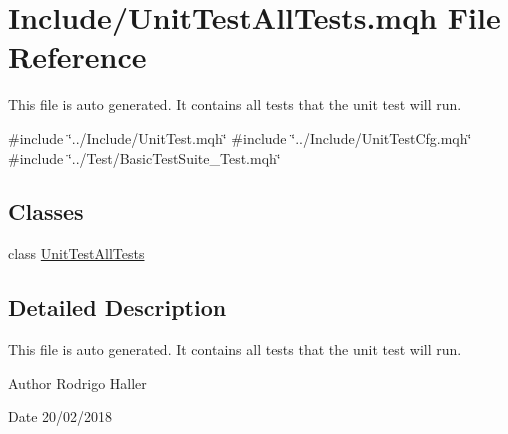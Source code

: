 \hypertarget{_unit_test_all_tests_8mqh}{}\section{Include/\+Unit\+Test\+All\+Tests.mqh File Reference}
\label{_unit_test_all_tests_8mqh}


This file is auto generated. It contains all tests that the unit test will run.  


{\ttfamily \#include \char`\"{}../\+Include/\+Unit\+Test.\+mqh\char`\"{}}\newline
{\ttfamily \#include \char`\"{}../\+Include/\+Unit\+Test\+Cfg.\+mqh\char`\"{}}\newline
{\ttfamily \#include \char`\"{}../\+Test/\+Basic\+Test\+Suite\+\_\+\+Test.\+mqh\char`\"{}}\newline
\subsection*{Classes}
\begin{DoxyCompactItemize}
\item 
class \mbox{\hyperlink{class_unit_test_all_tests}{Unit\+Test\+All\+Tests}}
\end{DoxyCompactItemize}


\subsection{Detailed Description}
This file is auto generated. It contains all tests that the unit test will run. 

\begin{DoxyAuthor}{Author}
Rodrigo Haller 
\end{DoxyAuthor}
\begin{DoxyDate}{Date}
20/02/2018 
\end{DoxyDate}
